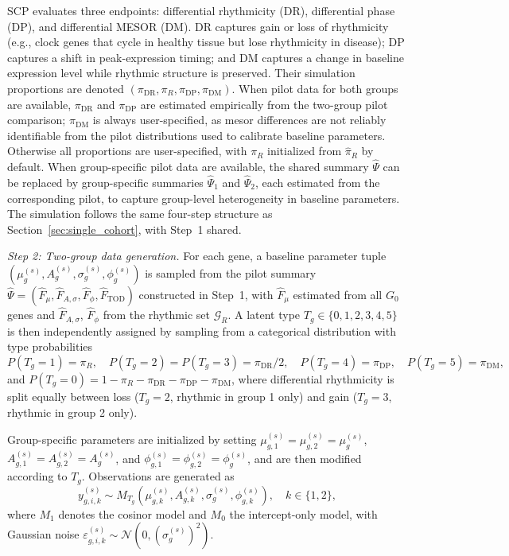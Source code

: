 \documentclass{article}
\begin{document}
\textsc{SCP} evaluates three endpoints: differential rhythmicity (DR), differential
phase (DP), and differential MESOR (DM). DR captures gain or loss of rhythmicity
(e.g., clock genes that cycle in healthy tissue but lose rhythmicity in disease);
DP captures a shift in peak-expression timing; and DM captures a change in
baseline expression level while rhythmic structure is preserved.
Their simulation proportions are denoted
$(\pi_{\mathrm{DR}}, \pi_R, \pi_{\mathrm{DP}}, \pi_{\mathrm{DM}})$.
When pilot data for both groups are available, $\pi_{\mathrm{DR}}$ and
$\pi_{\mathrm{DP}}$ are estimated empirically from the two-group pilot comparison;
$\pi_{\mathrm{DM}}$ is always user-specified, as mesor differences are not reliably
identifiable from the pilot distributions used to calibrate baseline parameters.
Otherwise all proportions are user-specified, with $\pi_R$ initialized from
$\hat{\pi}_R$ by default. When group-specific pilot data are available, the shared
summary $\hat{\Psi}$ can be replaced by group-specific summaries
$\hat{\Psi}_1$ and $\hat{\Psi}_2$, each estimated from the corresponding pilot,
to capture group-level heterogeneity in baseline parameters.
The simulation follows the same four-step structure as
Section~\ref{sec:single_cohort}, with Step~1 shared.

\emph{Step 2: Two-group data generation.}
For each gene, a baseline parameter tuple
$(\mu_g^{(s)}, A_g^{(s)}, \sigma_g^{(s)}, \phi_g^{(s)})$
is sampled from the pilot summary
$\hat{\Psi}=(\hat{F}_{\mu},\hat{F}_{A,\sigma},\hat{F}_{\phi},\hat{F}_{\mathrm{TOD}})$
constructed in Step~1, with $\hat{F}_\mu$ estimated from all $G_0$ genes and
$\hat{F}_{A,\sigma}$, $\hat{F}_\phi$ from the rhythmic set $\mathcal{G}_R$.
A latent type $T_g \in \{0,1,2,3,4,5\}$ is then independently assigned
by sampling from a categorical distribution with type probabilities
\[
P(T_g = 1) = \pi_R, \quad
P(T_g = 2) = P(T_g = 3) = \pi_{\mathrm{DR}} / 2, \quad
P(T_g = 4) = \pi_{\mathrm{DP}}, \quad
P(T_g = 5) = \pi_{\mathrm{DM}},
\]
and
$P(T_g = 0) = 1 - \pi_R - \pi_{\mathrm{DR}} - \pi_{\mathrm{DP}} -
\pi_{\mathrm{DM}}$,
where differential rhythmicity is split equally between loss
($T_g = 2$, rhythmic in group 1 only) and gain ($T_g = 3$, rhythmic in
group 2 only).

Group-specific parameters are initialized by setting
$\mu_{g,1}^{(s)} = \mu_{g,2}^{(s)} = \mu_g^{(s)}$,
$A_{g,1}^{(s)} = A_{g,2}^{(s)} = A_g^{(s)}$, and
$\phi_{g,1}^{(s)} = \phi_{g,2}^{(s)} = \phi_g^{(s)}$, and are then modified
according to $T_g$. Observations are generated as
\[
y_{g,i,k}^{(s)} \sim M_{T_g}(\mu_{g,k}^{(s)}, A_{g,k}^{(s)}, \sigma_g^{(s)}, \phi_{g,k}^{(s)}),
\quad k\in\{1,2\},
\]
where $M_1$ denotes the cosinor model and $M_0$ the intercept-only model,
with Gaussian noise $\varepsilon_{g,i,k}^{(s)} \sim \mathcal{N}(0,(\sigma_g^{(s)})^2)$.
\end{document}
